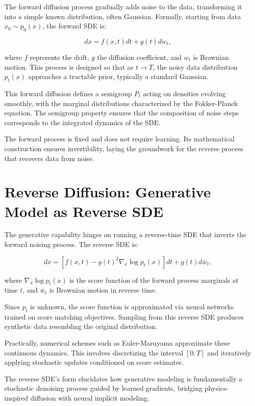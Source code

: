 \documentclass[a4paper,12pt,oneside]{memoir}
\begin{document}
The forward diffusion process gradually adds noise to the data, transforming it into a simple known distribution, often Gaussian. Formally, starting from data \( x_0 \sim p_0(x) \), the forward SDE is:

\[
dx = f(x,t) dt + g(t) dw_t,
\]

where \( f \) represents the drift, \( g \) the diffusion coefficient, and \( w_t \) is Brownian motion. This process is designed so that as \( t \to T \), the noisy data distribution \( p_t(x) \) approaches a tractable prior, typically a standard Gaussian.

This forward diffusion defines a semigroup \( P_t \) acting on densities evolving smoothly, with the marginal distributions characterized by the Fokker-Planck equation. The semigroup property ensures that the composition of noise steps corresponds to the integrated dynamics of the SDE.

The forward process is fixed and does not require learning. Its mathematical construction ensures invertibility, laying the groundwork for the reverse process that recovers data from noise.

\section{Reverse Diffusion: Generative Model as Reverse SDE}

The generative capability hinges on running a reverse-time SDE that inverts the forward noising process. The reverse SDE is:

\[
dx = \left[f(x,t) - g(t)^2 \nabla_x \log p_t(x) \right] dt + g(t) d\bar{w}_t,
\]

where \( \nabla_x \log p_t(x) \) is the score function of the forward process marginals at time \( t \), and \( \bar{w}_t \) is Brownian motion in reverse time.

Since \( p_t \) is unknown, the score function is approximated via neural networks trained on score matching objectives. Sampling from this reverse SDE produces synthetic data resembling the original distribution.

Practically, numerical schemes such as Euler-Maruyama approximate these continuous dynamics. This involves discretizing the interval \( [0, T] \) and iteratively applying stochastic updates conditioned on score estimates.

The reverse SDE’s form elucidates how generative modeling is fundamentally a stochastic denoising process guided by learned gradients, bridging physics-inspired diffusion with neural implicit modeling.
\end{document}
